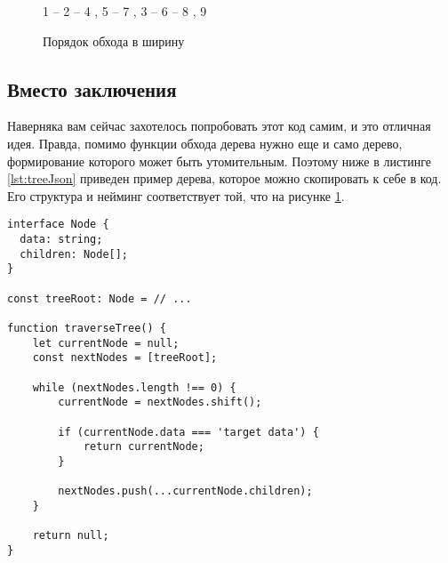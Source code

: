 \documentclass[../article.tex]{subfiles}
\begin{document}
\begin{figure}
    \styledgraph
    {
        1 -- { 2 -- { 4 , 5 -- 7 }, 3 -- 6 -- { 8 , 9 }}
    }
    \caption{Порядок обхода в ширину}
    \label{fig:treeBfsOrder}
\end{figure}

\subsection{Вместо заключения}
Наверняка вам сейчас захотелось попробовать этот код самим, и это отличная идея. Правда, помимо функции обхода дерева нужно еще и само дерево, формирование которого может быть утомительным. Поэтому ниже в листинге \ref{lst:treeJson} приведен пример дерева, которое можно скопировать к себе в код. Его структура и нейминг соответствует той, что на рисунке \ref{fig:treeBfsOrder}.


\begin{strip}
    \begin{ruledelement}
        \begin{lstlisting}[caption={Обход дерева в ширину}, label={lst:treeBfs}]
interface Node {
  data: string;
  children: Node[];
}

const treeRoot: Node = // ...

function traverseTree() {
    let currentNode = null;
    const nextNodes = [treeRoot];

    while (nextNodes.length !== 0) {
        currentNode = nextNodes.shift();

        if (currentNode.data === 'target data') {
            return currentNode;
        }

        nextNodes.push(...currentNode.children);
    }

    return null;
}

        \end{lstlisting}
    \end{ruledelement}
\end{strip}
\end{document}
